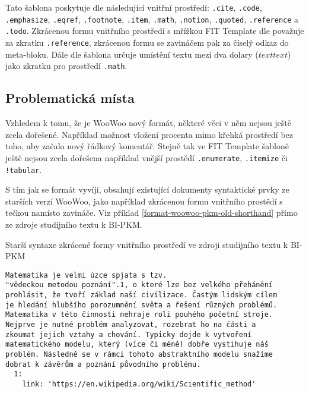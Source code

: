 \begin{sloppypar}
Tato šablona poskytuje dle \cite{woowoo} následující vnitřní prostředí: \texttt{.cite}, \texttt
{.code}, \texttt{.emphasize}, \texttt{.eqref}, \texttt{.footnote}, \texttt
{.item}, \texttt{.math}, \texttt{.notion}, \texttt{.quoted}, \texttt{.reference}
a \texttt{.todo}. Zkrácenou formu vnitřního prostředí s mřížkou FIT Template dle \cite{woowoo} považuje za
zkratku \texttt{.reference}, zkrácenou formu se zavináčem pak za číselý odkaz do meta-bloku. Dále dle
\cite{woowoo} šablona určuje umístění textu mezi dva dolary (\texttt{$text text$}) jako zkratku pro prostředí
\texttt{.math}.
\end{sloppypar}

\subsection{Problematická místa}

Vzhledem k tomu, že je WooWoo nový formát, některé věci v něm nejsou ještě zcela dořešené. Například možnost vložení
procenta mimo křehká prostředí bez toho, aby začalo nový řádkový komentář. Stejně tak ve FIT Template šabloně ještě
nejsou zcela dořešena například vnější prostědí \texttt{.enumerate}, \texttt{.itemize} či
\texttt{!tabular}.

S tím jak se formát vyvíjí, obsahují existující dokumenty syntaktické prvky ze starších verzí WooWoo, jako například
zkrácenou formu vnitřního prostědí s tečkou namísto zavináče. Viz příklad \ref{format-woowoo-pkm-old-shorthand} přímo ze
zdroje studijního textu k BI-PKM.

\begin{listing}
    \caption{Starší syntaxe zkrácené formy vnitřního prostředí ve zdroji studijního textu k BI-PKM \cite{pkm}}
    \label{format-woowoo-pkm-old-shorthand}
    \begin{verbatim}
Matematika je velmi úzce spjata s tzv.
"vědeckou metodou poznání".1, o které lze bez velkého přehánění
prohlásit, že tvoří základ naší civilizace. Častým lidským cílem
je hledání hlubšího porozumnění světa a řešení různých problémů.
Matematika v této činnosti nehraje roli pouhého početní stroje.
Nejprve je nutné problém analyzovat, rozebrat ho na části a
zkoumat jejich vztahy a chování. Typicky dojde k vytvoření
matematického modelu, který (více či méně) dobře vystihuje náš
problém. Následně se v rámci tohoto abstraktního modelu snažíme
dobrat k závěrům a poznání původního problému.
  1:
    link: 'https://en.wikipedia.org/wiki/Scientific_method'
    \end{verbatim}
\end{listing}

